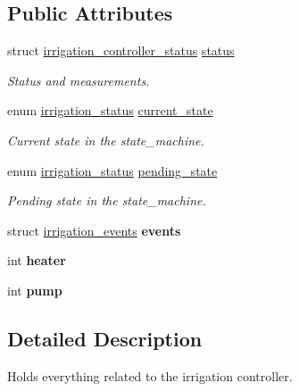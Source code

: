 \subsection*{Public Attributes}
\begin{DoxyCompactItemize}
\item 
struct \hyperlink{structirrigation__controller__status}{irrigation\+\_\+controller\+\_\+status} \hyperlink{structirrigation__controller_a68a854df15c9234d24f2ad36b990bfa8}{status}
\begin{DoxyCompactList}\small\item\em Status and measurements. \end{DoxyCompactList}\item 
enum \hyperlink{irrigation_8h_ac40bd72ec6942e213e454ebcacc92dc7}{irrigation\+\_\+status} \hyperlink{structirrigation__controller_a80bec16de2d6f98564ed1487dee041c5}{current\+\_\+state}
\begin{DoxyCompactList}\small\item\em Current state in the state\+\_\+machine. \end{DoxyCompactList}\item 
enum \hyperlink{irrigation_8h_ac40bd72ec6942e213e454ebcacc92dc7}{irrigation\+\_\+status} \hyperlink{structirrigation__controller_a7e1c5689983d2b8aae434c2d5442c935}{pending\+\_\+state}
\begin{DoxyCompactList}\small\item\em Pending state in the state\+\_\+machine. \end{DoxyCompactList}\item 
\hypertarget{structirrigation__controller_a4ae62413005c2121bee0ac25a0119cbc}{}struct \hyperlink{structirrigation__events}{irrigation\+\_\+events} {\bfseries events}\label{structirrigation__controller_a4ae62413005c2121bee0ac25a0119cbc}

\item 
\hypertarget{structirrigation__controller_a94cb4b4c26de9f40543f06335afa036c}{}int {\bfseries heater}\label{structirrigation__controller_a94cb4b4c26de9f40543f06335afa036c}

\item 
\hypertarget{structirrigation__controller_a38217da0082898392465f4ee2901f73b}{}int {\bfseries pump}\label{structirrigation__controller_a38217da0082898392465f4ee2901f73b}

\end{DoxyCompactItemize}


\subsection{Detailed Description}
Holds everything related to the irrigation controller. 

